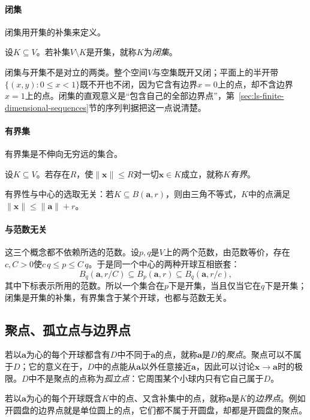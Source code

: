 \paragraph{闭集}
闭集用开集的补集来定义。
\begin{definition}[闭集]
\label{def:multivariable-closed-set}
设$K\subseteq V$。若补集$V\setminus K$是开集，就称$K$为\emph{闭集}。
\end{definition}
闭集与开集不是对立的两类。整个空间$V$与空集既开又闭；平面上的半开带$\{(x,y):0\leq x<1\}$既不开也不闭，因为它含有边界$x=0$上的点，却不含边界$x=1$上的点。闭集的直观意义是“包含自己的全部边界点”，第~\ref{sec:ls-finite-dimensional-sequences}节的序列判据把这一点说清楚。

\paragraph{有界集}
有界集是不伸向无穷远的集合。
\begin{definition}[有界集]
\label{def:multivariable-bounded-set}
设$K\subseteq V$。若存在$R$，使$\lVert\bm x\rVert\leq R$对一切$\bm x\in K$成立，就称$K$\emph{有界}。
\end{definition}
有界性与中心的选取无关：若$K\subseteq B(\bm a,r)$，则由三角不等式，$K$中的点满足$\lVert\bm x\rVert\leq\lVert\bm a\rVert+r$。

\paragraph{与范数无关}
这三个概念都不依赖所选的范数。设$p,q$是$V$上的两个范数，由范数等价，存在$c,C>0$使$c\,q\leq p\leq C\,q$。于是同一个中心的两种开球互相嵌套：
\[
 B_q(\bm a,r/C)\subseteq B_p(\bm a,r)\subseteq B_q(\bm a,r/c),
\]
其中下标表示所用的范数。所以一个集合在$p$下是开集，当且仅当它在$q$下是开集；闭集是开集的补集，有界集含于某个开球，也都与范数无关。

\subsection{聚点、孤立点与边界点}
\label{sec:multivariable-limit-points}

若以$\bm a$为心的每个开球都含有$D$中不同于$\bm a$的点，就称$\bm a$是$D$的\emph{聚点}。聚点可以不属于$D$；它的意义在于，$D$中的点能从$\bm a$以外任意接近$\bm a$，因此可以讨论$\bm x\to\bm a$时的极限。$D$中不是聚点的点称为\emph{孤立点}：它周围某个小球内只有它自己属于$D$。

若以$\bm a$为心的每个开球既含$K$中的点、又含补集中的点，就称$\bm a$是$K$的\emph{边界点}。例如开圆盘的边界点就是单位圆上的点，它们都不属于开圆盘，却都是开圆盘的聚点。

